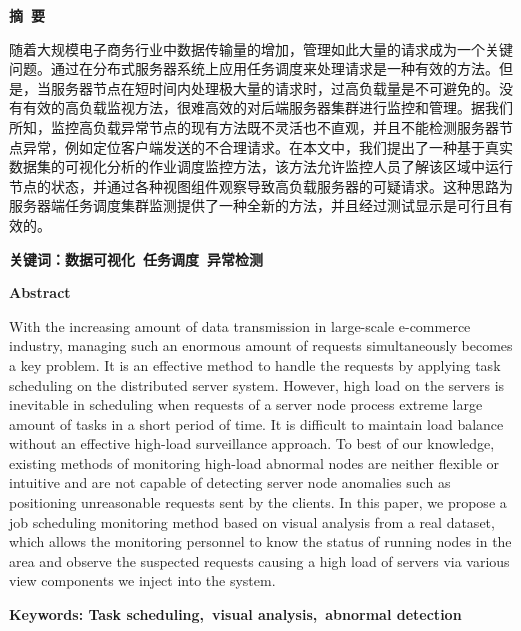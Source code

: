 \begin{center}
	\Large{\textbf{摘\ 要}}
\end{center}

随着大规模电子商务行业中数据传输量的增加，管理如此大量的请求成为一个关键问题。通过在分布式服务器系统上应用任务调度来处理请求是一种有效的方法。但是，当服务器节点在短时间内处理极大量的请求时，过高负载量是不可避免的。没有有效的高负载监视方法，很难高效的对后端服务器集群进行监控和管理。据我们所知，监控高负载异常节点的现有方法既不灵活也不直观，并且不能检测服务器节点异常，例如定位客户端发送的不合理请求。在本文中，我们提出了一种基于真实数据集的可视化分析的作业调度监控方法，该方法允许监控人员了解该区域中运行节点的状态，并通过各种视图组件观察导致高负载服务器的可疑请求。这种思路为服务器端任务调度集群监测提供了一种全新的方法，并且经过测试显示是可行且有效的。
	
	\textbf{关键词：数据可视化\ 任务调度\ 异常检测}



\newpage


\begin{center}
	\large{\textbf{Abstract}}
\end{center}

With the increasing amount of data transmission in large-scale e-commerce industry, managing such an enormous amount of requests simultaneously becomes a key problem. It is an effective method to handle the requests by applying task scheduling on the distributed server system. However, high load on the servers is inevitable in scheduling when requests of a server node process extreme large amount of tasks in a short period of time. It is difficult to maintain load balance without an effective high-load surveillance approach. To best of our knowledge, existing methods of monitoring high-load abnormal nodes are neither flexible or intuitive and are not capable of detecting server node anomalies such as positioning unreasonable requests sent by the clients. In this paper, we propose a job scheduling monitoring method based on visual analysis from a real dataset, which allows the monitoring personnel to know the status of running nodes in the area and observe the suspected requests causing a high load of servers via various view components we inject into the system.

\textbf{Keywords: Task scheduling,\ visual analysis,\ abnormal detection}



\newpage
